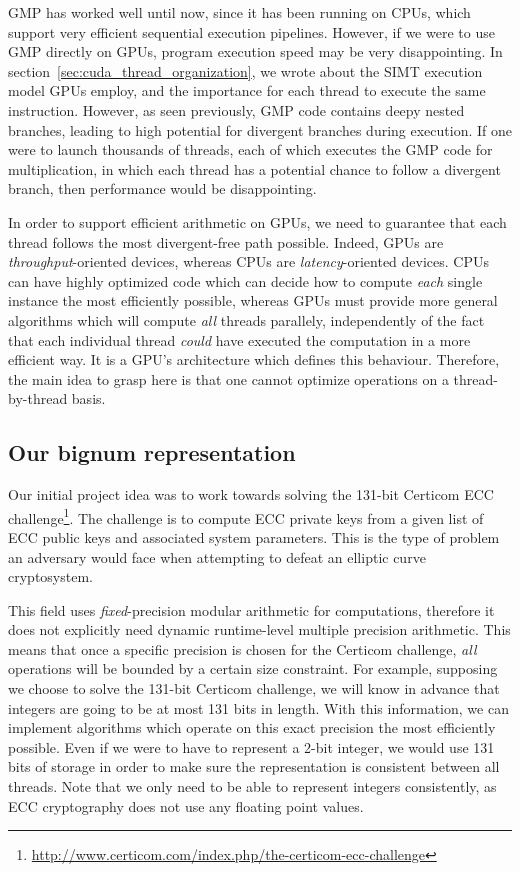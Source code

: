 \documentclass[12pt, a4paper]{report}
\begin{document}
\begin{sloppypar}
GMP has worked well until now, since it has been running on CPUs, which support
very efficient sequential execution pipelines.
However, if we were to use GMP directly on GPUs, program execution speed may be
very disappointing.
In section~\ref{sec:cuda_thread_organization}, we wrote about the SIMT execution
model GPUs employ, and the importance for each thread to execute the same
instruction.
However, as seen previously, GMP code contains deepy nested branches, leading to
high potential for divergent branches during execution.
If one were to launch thousands of threads, each of which executes the GMP code
for multiplication, in which each thread has a potential chance to follow a
divergent branch, then performance would be disappointing.

In order to support efficient arithmetic on GPUs, we need to guarantee that each
thread follows the most divergent-free path possible.
Indeed, GPUs are \emph{throughput}-oriented devices, whereas CPUs are
\emph{latency}-oriented devices.
CPUs can have highly optimized code which can decide how to compute \emph{each}
single instance the most efficiently possible, whereas GPUs must provide more
general algorithms which will compute \emph{all} threads parallely,
independently of the fact that each individual thread \emph{could} have executed
the computation in a more efficient way.
It is a GPU's architecture which defines this behaviour.
Therefore, the main idea to grasp here is that one cannot optimize operations on
a thread-by-thread basis.

\subsection{Our bignum representation}
Our initial project idea was to work towards solving the 131-bit Certicom ECC
challenge\footnote{\url{http://www.certicom.com/index.php/the-certicom-ecc-challenge}}.
The challenge is to compute ECC private keys from a given list of ECC public
keys and associated system parameters. This is the type of problem an adversary
would face when attempting to defeat an elliptic curve cryptosystem.

This field uses \emph{fixed}-precision modular arithmetic for computations,
therefore it does not explicitly need dynamic runtime-level multiple precision
arithmetic.
This means that once a specific precision is chosen for the Certicom challenge,
\emph{all} operations will be bounded by a certain size constraint.
For example, supposing we choose to solve the 131-bit Certicom challenge, we
will know in advance that integers are going to be at most 131 bits in length.
With this information, we can implement algorithms which operate on this exact
precision the most efficiently possible.
Even if we were to have to represent a 2-bit integer, we would use 131 bits of
storage in order to make sure the representation is consistent between all
threads.
Note that we only need to be able to represent integers consistently, as
ECC cryptography does not use any floating point values.


\end{sloppypar}
\end{document}
